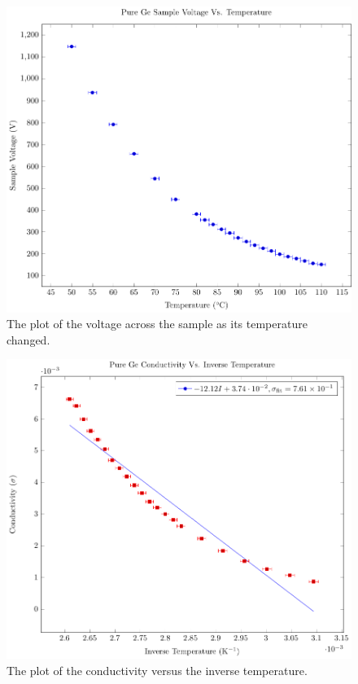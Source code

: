 \documentclass[a4paper]{article}
\begin{document}
\begin{figure}[H]
  \begin{center}
    \includegraphics[scale=0.7]{PureGePlots/pureGeSamVoltVsTemp.pdf}
  \end{center}
  \caption{The plot of the voltage across the sample as its temperature changed.}
\end{figure}

\begin{figure}[H]
  \begin{center}
    \includegraphics[scale=0.7]{PureGePlots/pureGeCondVsInvTemp.pdf}
  \end{center}
  \caption{The plot of the conductivity versus the inverse temperature.}
\end{figure}
\end{document}
